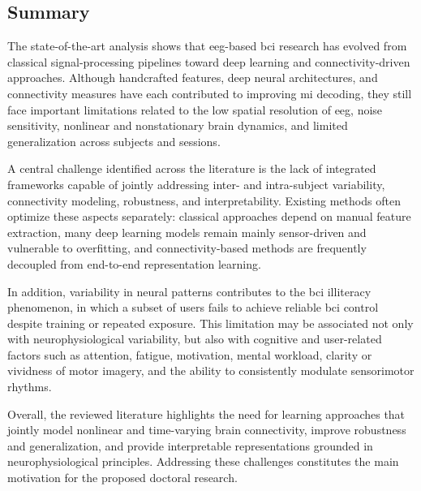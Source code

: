 \subsection{Summary}

{The state-of-the-art analysis shows that \gls{eeg}-based \gls{bci} research has evolved from classical signal-processing pipelines toward deep learning and connectivity-driven approaches. Although handcrafted features, deep neural architectures, and connectivity measures have each contributed to improving \gls{mi} decoding, they still face important limitations related to the low spatial resolution of \gls{eeg}, noise sensitivity, nonlinear and nonstationary brain dynamics, and limited generalization across subjects and sessions.}

{A central challenge identified across the literature is the lack of integrated frameworks capable of jointly addressing inter- and intra-subject variability, connectivity modeling, robustness, and interpretability. Existing methods often optimize these aspects separately: classical approaches depend on manual feature extraction, many deep learning models remain mainly sensor-driven and vulnerable to overfitting, and connectivity-based methods are frequently decoupled from end-to-end representation learning.}

{In addition, variability in neural patterns contributes to the \gls{bci} illiteracy phenomenon, in which a subset of users fails to achieve reliable \gls{bci} control despite training or repeated exposure. This limitation may be associated not only with neurophysiological variability, but also with cognitive and user-related factors such as attention, fatigue, motivation, mental workload, clarity or vividness of motor imagery, and the ability to consistently modulate sensorimotor rhythms.}

{Overall, the reviewed literature highlights the need for learning approaches that jointly model nonlinear and time-varying brain connectivity, improve robustness and generalization, and provide interpretable representations grounded in neurophysiological principles. Addressing these challenges constitutes the main motivation for the proposed doctoral research.}


